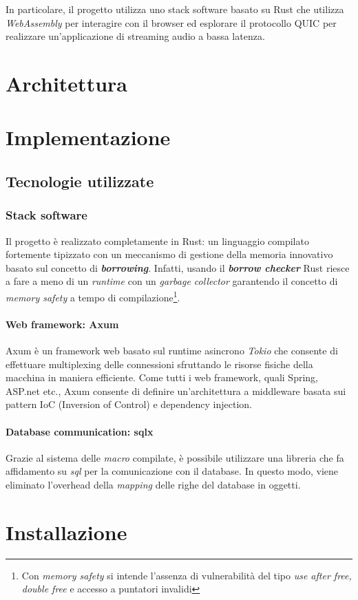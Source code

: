 \documentclass{article}
\begin{document}
In particolare, il progetto utilizza uno stack software basato su Rust che utilizza
\textit{WebAssembly} per interagire con il browser ed esplorare il protocollo QUIC per
realizzare un'applicazione di streaming audio a bassa latenza.
\clearpage
\section{Architettura}
\clearpage
\section{Implementazione}
\subsection{Tecnologie utilizzate}
\subsubsection{Stack software}
Il progetto è realizzato completamente in Rust: un linguaggio compilato fortemente tipizzato
con un meccanismo di gestione della memoria innovativo basato sul concetto di
\textbf{\textit{borrowing}}. 
Infatti, usando il \textbf{\textit{borrow checker}} Rust riesce a fare a meno di un 
\textit{runtime} con un \textit{garbage collector} garantendo il concetto di \textit{memory
safety} a tempo di compilazione\footnote{Con \textit{memory safety} si intende l'assenza 
di vulnerabilità del tipo \textit{use after free, double free} e accesso a puntatori
invalidi}.

\paragraph{Web framework: Axum} Axum è un framework web basato sul runtime asincrono
\textit{Tokio} che consente di effettuare multiplexing delle connessioni sfruttando le 
risorse fisiche della macchina in maniera efficiente. Come tutti i web framework, quali
Spring, ASP.net etc., Axum consente di definire un'architettura a middleware basata sui
pattern IoC (Inversion of Control) e dependency injection. 

\paragraph{Database communication: sqlx} Grazie al sistema delle \textit{macro} compilate,
è possibile utilizzare una libreria che fa affidamento su \textit{sql} per la comunicazione 
con il database. In questo modo, viene eliminato l'overhead della \textit{mapping} delle 
righe del database in oggetti.

\clearpage
\section{Installazione}
\clearpage




\end{document}

